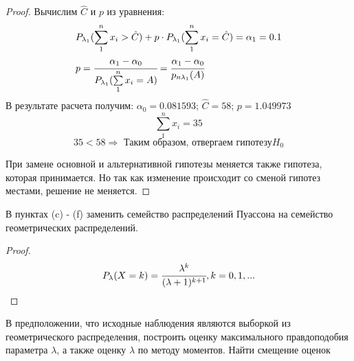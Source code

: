 \begin{proof}
	Вычислим $\hat{C}$ и $p$ из уравнения:		
	\begin{align}
		& P_{\lambda_1}(\sum\limits_1^nx_i>\hat{C})+p\cdot P_{\lambda_1}(\sum\limits_1^nx_i=\hat{C})=\alpha_1=0.1 \\
		& p=\cfrac{\alpha_1-\alpha_0}{P_{\lambda_1}(\sum\limits_1^nx_i=A)}=\cfrac{\alpha_1-\alpha_0}{p_{n\lambda_1}(A)} \\
	\end{align}
	В результате расчета получим: $\alpha_0=0.081593$; $\hat{C}=58$; $p=1.049973$
	\begin{equation}
		\sum\limits_1^nx_i=35
	\end{equation}
	\begin{equation}
		35<58\Rightarrow\text{ Таким образом, отвергаем гипотезу} H_0 
	\end{equation}
	
	При замене основной и альтернативной гипотезы меняется также гипотеза, которая принимается. Но так как изменение происходит со сменой гипотез местами, решение не меняется.
\end{proof}


\newpage
\begin{problem}
	В пунктах (c) - (f) заменить семейство распределений Пуассона на семейство геометрических распределений.
\end{problem}

\begin{proof}
	$ $
	\begin{equation}
		P_{\lambda}(X=k)=\cfrac{\lambda^k}{(\lambda+1)^{k+1}}, k = 0, 1, ...
	\end{equation}
\end{proof}


\begin{problem}
	В предположении, что исходные наблюдения являются выборкой из геометрического распределения, построить оценку максимального правдоподобия параметра $\lambda$, а также оценку $\lambda$ по методу моментов. Найти смещение оценок 	
\end{problem}

